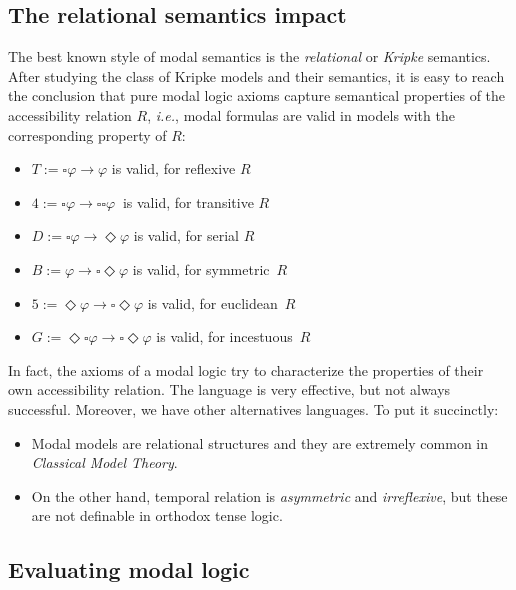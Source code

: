 \subsection{The relational semantics impact}

The best known style of modal semantics is the \emph{relational} or 
\emph{Kripke} semantics. After studying the class of Kripke models and their
semantics, it is easy to reach the conclusion that pure modal logic axioms
capture semantical properties of the accessibility relation $R$, \emph{i.e.},
modal formulas are valid in models with the corresponding property of $R$:

\begin{itemize}
\item $T:=\square \varphi \rightarrow \varphi $ is valid, for reflexive $R$

\item $4:=\square \varphi \rightarrow \square \square \varphi \ $ is valid,
for transitive $R$

\item $D:=\square \varphi \rightarrow \Diamond \varphi $ is valid, for
serial $R$

\item $B:=\varphi \rightarrow \square \Diamond \varphi $ is valid, for
symmetric\ $R$

\item $5:=\Diamond \varphi \rightarrow \square \Diamond \varphi $ is valid,
for euclidean\ $R$

\item $G:=\Diamond \square \varphi \rightarrow \square \Diamond \varphi $ is
valid, for incestuous\ $R$
\end{itemize}

In fact, the axioms of a modal logic try to characterize the properties of
their own accessibility relation. The language is very effective, but not
always successful. Moreover, we have other alternatives languages. To put it
succinctly:

\begin{itemize}
\item Modal models are relational structures and they are extremely common
in \textit{Classical Model Theory}. 

\item On the other hand, temporal relation is \emph{asymmetric} and
\emph{irreflexive}, but these are not definable in orthodox tense logic.
\end{itemize}

\subsection{Evaluating modal logic}

